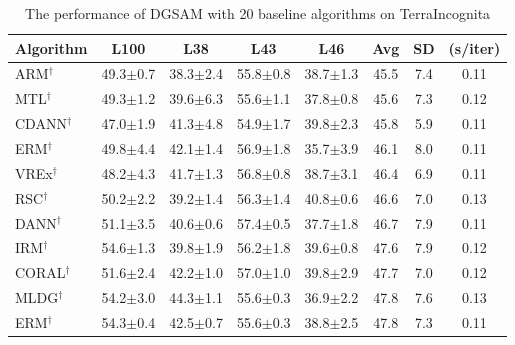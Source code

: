 \documentclass{article}
\theoremstyle{plain}
\theoremstyle{definition}
\theoremstyle{remark}
\begin{document}
\begin{table}[!ht]
\centering
\normalsize
\caption{The performance of DGSAM with 20 baseline algorithms on TerraIncognita}
\begin{tabular}{l|cccc|ccc}
\hline
Algorithm        & L100    & L38    & L43   & L46   & Avg   & SD   & (s/iter) \\ \toprule
ARM\(^\dag\) \cite{zhang2021arm}         & {49.3\scriptsize$\pm$0.7} & {38.3\scriptsize$\pm$2.4} & {55.8\scriptsize$\pm$0.8} & {38.7\scriptsize$\pm$1.3} & 45.5 & 7.4 & 0.11 \\
MTL\(^\dag\) \cite{blanchard2021mtl}         & {49.3\scriptsize$\pm$1.2} & {39.6\scriptsize$\pm$6.3} & {55.6\scriptsize$\pm$1.1} & {37.8\scriptsize$\pm$0.8} & 45.6 & 7.3 & 0.12 \\
CDANN\(^\dag\) \cite{li2018cdann}         & {47.0\scriptsize$\pm$1.9} & {41.3\scriptsize$\pm$4.8} & {54.9\scriptsize$\pm$1.7} & {39.8\scriptsize$\pm$2.3} & 45.8 & 5.9 & 0.11 \\
ERM\(^\dag\)         & {49.8\scriptsize$\pm$4.4} & {42.1\scriptsize$\pm$1.4} & {56.9\scriptsize$\pm$1.8} & {35.7\scriptsize$\pm$3.9} & 46.1 & 8.0 & 0.11 \\
VREx\(^\dag\) \cite{krueger2021vrex}         & {48.2\scriptsize$\pm$4.3} & {41.7\scriptsize$\pm$1.3} & {56.8\scriptsize$\pm$0.8} & {38.7\scriptsize$\pm$3.1} & 46.4 & 6.9 & 0.11 \\
RSC\(^\dag\) \cite{huang2020rsc}         & {50.2\scriptsize$\pm$2.2} & {39.2\scriptsize$\pm$1.4} & {56.3\scriptsize$\pm$1.4} & {40.8\scriptsize$\pm$0.6} & 46.6 & 7.0 & 0.13 \\
DANN\(^\dag\) \cite{ganin2016dann}         & {51.1\scriptsize$\pm$3.5} & {40.6\scriptsize$\pm$0.6} & {57.4\scriptsize$\pm$0.5} & {37.7\scriptsize$\pm$1.8} & 46.7 & 7.9 & 0.11 \\
IRM\(^\dag\) \cite{arjovsky2019irm}         & {54.6\scriptsize$\pm$1.3} & {39.8\scriptsize$\pm$1.9} & {56.2\scriptsize$\pm$1.8} & {39.6\scriptsize$\pm$0.8} & 47.6 & 7.9 & 0.12 \\
CORAL\(^\dag\) \cite{sun2016coral}         & {51.6\scriptsize$\pm$2.4} & {42.2\scriptsize$\pm$1.0} & {57.0\scriptsize$\pm$1.0} & {39.8\scriptsize$\pm$2.9} & 47.7 & 7.0 & 0.12 \\
MLDG\(^\dag\) \cite{li2018mldg}         & {54.2\scriptsize$\pm$3.0} & {44.3\scriptsize$\pm$1.1} & {55.6\scriptsize$\pm$0.3} & {36.9\scriptsize$\pm$2.2} & 47.8 & 7.6 & 0.13 \\
ERM\(^\dag\)         & {54.3\scriptsize$\pm$0.4} & {42.5\scriptsize$\pm$0.7} & {55.6\scriptsize$\pm$0.3} & {38.8\scriptsize$\pm$2.5} & 47.8 & 7.3 & 0.11 \\

\end{tabular}
\end{table}
\end{document}
